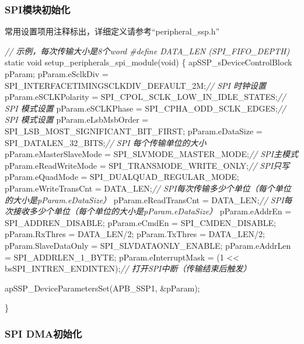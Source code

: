 \documentclass[
  12pt,
]{book}
\newenvironment{Shaded}{\begin{snugshade}}{\end{snugshade}}
\newcommand{\CommentTok}[1]{\textcolor[rgb]{0.56,0.35,0.01}{\textit{#1}}}
\newcommand{\DataTypeTok}[1]{\textcolor[rgb]{0.13,0.29,0.53}{#1}}
\newcommand{\DecValTok}[1]{\textcolor[rgb]{0.00,0.00,0.81}{#1}}
\newcommand{\NormalTok}[1]{#1}
\newcommand{\PreprocessorTok}[1]{\textcolor[rgb]{0.56,0.35,0.01}{\textit{#1}}}
\begin{document}
\hypertarget{spiux6a21ux5757ux521dux59cbux5316-2}{%
\subsubsection{SPI模块初始化}\label{spiux6a21ux5757ux521dux59cbux5316-2}}

常用设置项用注释标出，详细定义请参考``peripheral\_ssp.h''

\begin{Shaded}
\begin{Highlighting}[]
\CommentTok{// 示例，每次传输大小是8个word}
\PreprocessorTok{#define DATA_LEN (SPI_FIFO_DEPTH)}
\DataTypeTok{static} \DataTypeTok{void}\NormalTok{ setup_peripherals_spi_module(}\DataTypeTok{void}\NormalTok{)}
\NormalTok{\{}
\NormalTok{    apSSP_sDeviceControlBlock pParam;}
\NormalTok{    pParam.eSclkDiv = SPI_INTERFACETIMINGSCLKDIV_DEFAULT_2M;}\CommentTok{// SPI 时钟设置}
\NormalTok{    pParam.eSCLKPolarity = SPI_CPOL_SCLK_LOW_IN_IDLE_STATES;}\CommentTok{// SPI 模式设置}
\NormalTok{    pParam.eSCLKPhase = SPI_CPHA_ODD_SCLK_EDGES;}\CommentTok{// SPI 模式设置}
\NormalTok{    pParam.eLsbMsbOrder = SPI_LSB_MOST_SIGNIFICANT_BIT_FIRST;}
\NormalTok{    pParam.eDataSize = SPI_DATALEN_32_BITS;}\CommentTok{// SPI 每个传输单位的大小}
\NormalTok{    pParam.eMasterSlaveMode = SPI_SLVMODE_MASTER_MODE;}\CommentTok{// SPI主模式}
\NormalTok{    pParam.eReadWriteMode = SPI_TRANSMODE_WRITE_ONLY;}\CommentTok{// SPI只写}
\NormalTok{    pParam.eQuadMode = SPI_DUALQUAD_REGULAR_MODE;}
\NormalTok{    pParam.eWriteTransCnt = DATA_LEN;}\CommentTok{// SPI每次传输多少个单位（每个单位的大小是pParam.eDataSize）}
\NormalTok{    pParam.eReadTransCnt = DATA_LEN;}\CommentTok{// SPI每次接收多少个单位（每个单位的大小是pParam.eDataSize）}
\NormalTok{    pParam.eAddrEn = SPI_ADDREN_DISABLE;}
\NormalTok{    pParam.eCmdEn = SPI_CMDEN_DISABLE;}
\NormalTok{    pParam.RxThres = DATA_LEN/}\DecValTok{2}\NormalTok{;}
\NormalTok{    pParam.TxThres = DATA_LEN/}\DecValTok{2}\NormalTok{;}
\NormalTok{    pParam.SlaveDataOnly = SPI_SLVDATAONLY_ENABLE;}
\NormalTok{    pParam.eAddrLen = SPI_ADDRLEN_1_BYTE;}
\NormalTok{    pParam.eInterruptMask = (}\DecValTok{1}\NormalTok{ << bsSPI_INTREN_ENDINTEN);}\CommentTok{// 打开SPI中断（传输结束后触发）}
  
\NormalTok{    apSSP_DeviceParametersSet(APB_SSP1, &pParam);}
    
\NormalTok{\}}
\end{Highlighting}
\end{Shaded}

\hypertarget{spi-dmaux521dux59cbux5316}{%
\subsubsection{SPI DMA初始化}\label{spi-dmaux521dux59cbux5316}}
\end{document}

